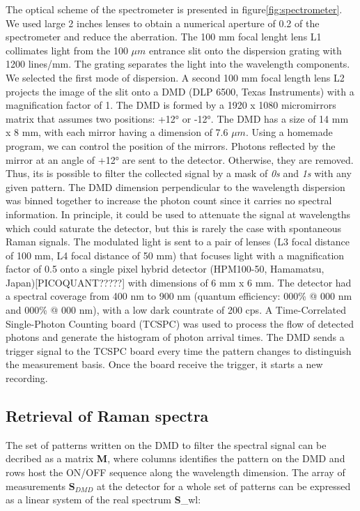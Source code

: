 \documentclass{osa-article}
\begin{document}
The optical scheme of the spectrometer is presented in figure\ref{fig:spectrometer}. We used large 2 inches lenses to obtain a numerical aperture of 0.2 of the spectrometer and reduce the aberration. The 100 mm focal lenght lens L1 collimates light from the 100 $\mu m$ entrance slit onto the dispersion grating with 1200 lines/mm. The grating separates the light into the wavelength components. We selected the first mode of dispersion. A second 100 mm focal length lens L2 projects the image of the slit onto a DMD (DLP 6500, Texas Instruments) with a magnification factor of 1. The DMD is formed by a 1920 x 1080  micromirrors matrix that assumes two positions: +12° or -12°. The DMD has a size of 14 mm x 8 mm, with each mirror having a dimension of 7.6 $\mu m$. Using a homemade program, we can control the position of the mirrors. Photons reflected by the mirror at an angle of +12° are sent to the detector. Otherwise, they are removed. Thus, its is possible to filter the collected signal by a mask of \emph{0s} and \emph{1s} with any given pattern. The DMD dimension perpendicular to the wavelength dispersion was binned together to increase the photon count since it carries no spectral information. In principle, it could be used to attenuate the signal at wavelengths which could saturate the detector, but this is rarely the case with spontaneous Raman signals. The modulated light is sent to a pair of lenses (L3 focal distance of 100 mm, L4 focal distance of 50 mm) that focuses light with a magnification factor of 0.5 onto a single pixel hybrid detector (HPM100-50, Hamamatsu, Japan)[PICOQUANT?????] with dimensions of 6 mm x 6 mm. The detector had a spectral coverage from 400 nm to 900 nm (quantum efficiency: 000\% @ 000 nm and 000\% @ 000 nm), with a low dark countrate of 200 cps. A Time-Correlated Single-Photon Counting board (TCSPC) was used to process the flow of detected photons and generate the histogram of photon arrival times. The DMD sends a trigger signal to the TCSPC board every time the pattern changes to distinguish the measurement basis. Once the board receive the trigger, it starts a new recording.


\subsection{Retrieval of Raman spectra}
The set of patterns written on the DMD to filter the spectral signal can be decribed as a matrix \textbf{M}, where columns identifies the pattern on the DMD and rows host the ON/OFF sequence along the wavelength dimension. The array of measurements $\textbf{S}_{DMD}$ at the detector for a whole set of patterns can be expressed as a linear system of the real spectrum \textbf{S}_{wl}:
\end{document}
